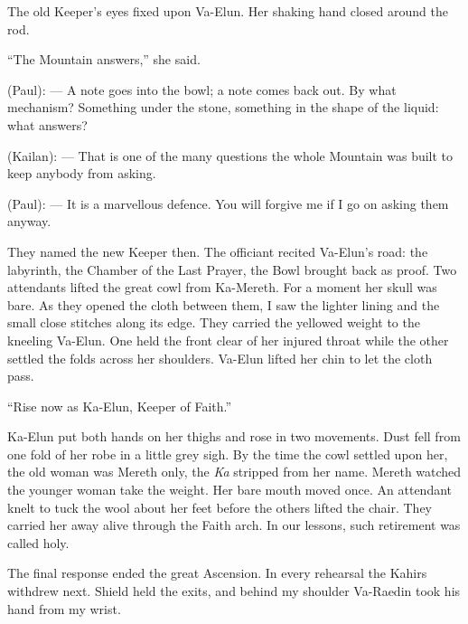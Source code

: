 The old Keeper's eyes fixed upon Va-Elun. Her shaking hand closed around the rod.\par

``The Mountain answers,'' she said.\par

\begin{room}

(Paul): --- A note goes into the bowl; a note comes back out. By what mechanism? Something under the stone, something in the shape of the liquid: what answers?

(Kailan): --- That is one of the many questions the whole Mountain was built to keep anybody from asking.

(Paul): --- It is a marvellous defence. You will forgive me if I go on asking them anyway.

\end{room}

They named the new Keeper then. The officiant recited Va-Elun's road: the labyrinth, the Chamber of the Last Prayer, the Bowl brought back as proof. Two attendants lifted the great cowl from Ka-Mereth. For a moment her skull was bare. As they opened the cloth between them, I saw the lighter lining and the small close stitches along its edge. They carried the yellowed weight to the kneeling Va-Elun. One held the front clear of her injured throat while the other settled the folds across her shoulders. Va-Elun lifted her chin to let the cloth pass.\par

``Rise now as Ka-Elun, Keeper of Faith.''\par

Ka-Elun put both hands on her thighs and rose in two movements. Dust fell from one fold of her robe in a little grey sigh. By the time the cowl settled upon her, the old woman was Mereth only, the \textit{Ka} stripped from her name. Mereth watched the younger woman take the weight. Her bare mouth moved once. An attendant knelt to tuck the wool about her feet before the others lifted the chair. They carried her away alive through the Faith arch. In our lessons, such retirement was called holy.\par

\ornament

The final response ended the great Ascension. In every rehearsal the Kahirs withdrew next. Shield held the exits, and behind my shoulder Va-Raedin took his hand from my wrist.\par

